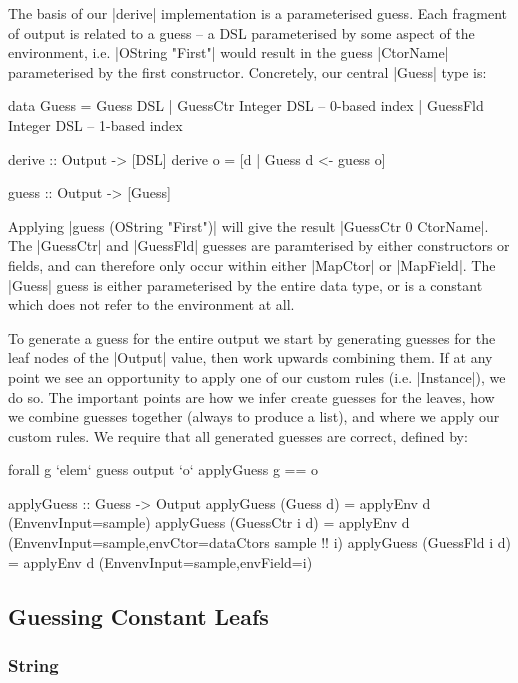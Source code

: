\documentclass[preprint,draft]{sigplanconf}
\begin{document}
The basis of our |derive| implementation is a parameterised guess. Each fragment of output is related to a guess -- a DSL parameterised by some aspect of the environment, i.e. |OString "First"| would result in the guess |CtorName| parameterised by the first constructor. Concretely, our central |Guess| type is:

\begin{code}
data Guess  =  Guess DSL
            |  GuessCtr Integer DSL -- 0-based index
            |  GuessFld Integer DSL -- 1-based index

derive :: Output -> [DSL]
derive o = [d | Guess d <- guess o]

guess :: Output -> [Guess]
\end{code}

Applying |guess (OString "First")| will give the result |GuessCtr 0 CtorName|. The |GuessCtr| and |GuessFld| guesses are paramterised by either constructors or fields, and can therefore only occur within either |MapCtor| or |MapField|. The |Guess| guess is either parameterised by the entire data type, or is a constant which does not refer to the environment at all.

To generate a guess for the entire output we start by generating guesses for the leaf nodes of the |Output| value, then work upwards combining them. If at any point we see an opportunity to apply one of our custom rules (i.e. |Instance|), we do so. The important points are how we infer create guesses for the leaves, how we combine guesses together (always to produce a list), and where we apply our custom rules. We require that all generated guesses are correct, defined by:

\ignore\begin{code}
forall g `elem` guess output `o` applyGuess g == o
\end{code}
\begin{code}
applyGuess :: Guess -> Output
applyGuess (Guess       d) = applyEnv d (Env{envInput=sample})
applyGuess (GuessCtr i  d) = applyEnv d (Env{envInput=sample,envCtor=dataCtors sample !! i})
applyGuess (GuessFld i  d) = applyEnv d (Env{envInput=sample,envField=i})
\end{code}

\subsection{Guessing Constant Leafs}

\subsubsection{String}
\end{document}

